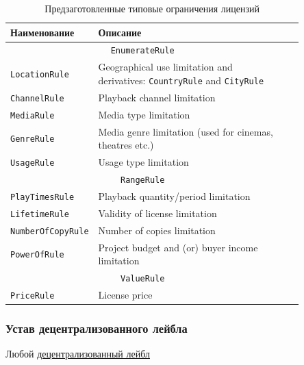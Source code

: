 \documentclass[12pt]{report}
\def\code#1{\colorbox{light-gray}{\texttt{#1}}}
\begin{document}
\begin{table}[H]
\centering
\caption{Предзаготовленные типовые ограничения лицензий}
\begin{tabular}{p{0.2\linewidth}p{0.65\linewidth}cc}
\toprule
Наименование & Описание \\
\bottomrule
\toprule
\multicolumn{2}{c}{\code{EnumerateRule}} \\
\midrule
	\code{LocationRule} & Geographical use limitation and derivatives: \code{CountryRule} and \code{CityRule} \\
	\code{ChannelRule} & Playback channel limitation \\
	\code{MediaRule} & Media type limitation \\
	\code{GenreRule} & Media genre limitation (used for cinemas, theatres etc.) \\
	\code{UsageRule} & Usage type limitation \\
\bottomrule
\toprule
\multicolumn{2}{c}{\code{RangeRule}} \\
\midrule
	\code{PlayTimesRule} & Playback quantity/period limitation \\
	\code{LifetimeRule} & Validity of license limitation \\
	\code{NumberOfCopyRule} & Number of copies limitation \\
	\code{PowerOfRule} & Project budget and (or) buyer income limitation \\
\bottomrule
\toprule
\multicolumn{2}{c}{\code{ValueRule}} \\
\midrule
	\code{PriceRule} & License price \\
\bottomrule
\end{tabular}
\end{table}

\subsubsection{Устав децентрализованного лейбла}
\label{tech-apps-dal-charter}
\begin{multicols}{2}
Любой \hyperref[tech-apps-dal]{децентрализованный лейбл} 
\end{multicols}
\end{document}
